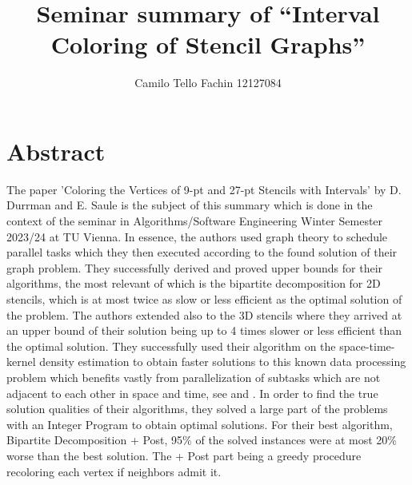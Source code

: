 \documentclass[sigconf]{acmart}
\author{Camilo Tello Fachin 12127084}
\affiliation{
  \institution{TU Wien (Computational Science \& Engineering)}
  \city{Vienna}
  \country{Austria}
}
\title{Seminar summary of ``Interval Coloring of Stencil Graphs''}
\begin{document}
\maketitle

\section{Abstract} 
The paper 'Coloring the Vertices of 9-pt and 27-pt Stencils with Intervals' by D. Durrman
and E. Saule \cite{main_paper} is the subject of this summary which is done in the context of the seminar in Algorithms/Software 
Engineering Winter Semester 2023/24 at TU Vienna. In essence, the authors used graph theory 
to schedule parallel tasks which they then executed according to the found solution of 
their graph problem. They successfully derived and proved upper bounds for their algorithms, 
the most relevant of which is the bipartite decomposition for 2D stencils, which is at most 
twice as slow or less efficient as the optimal solution of the problem. The authors extended 
also to the 3D stencils where they arrived at an upper bound of their solution being up 
to 4 times slower or less efficient than the optimal solution. They successfully used their 
algorithm on the space-time-kernel density estimation to obtain faster solutions to this 
known data processing problem which benefits vastly from parallelization of subtasks which 
are not adjacent to each other in space and time, see \cite{kernel_estimation_1} and \cite{kernel_estimation_2}. In order to find the true solution qualities 
of their algorithms, they solved a large part of the problems with an Integer Program to 
obtain optimal solutions. For their best algorithm, Bipartite Decomposition + Post, 95\% 
of the solved instances were at most 20\% worse than the best solution. The + Post part 
being a greedy procedure recoloring each vertex if neighbors admit it.
\end{document}
